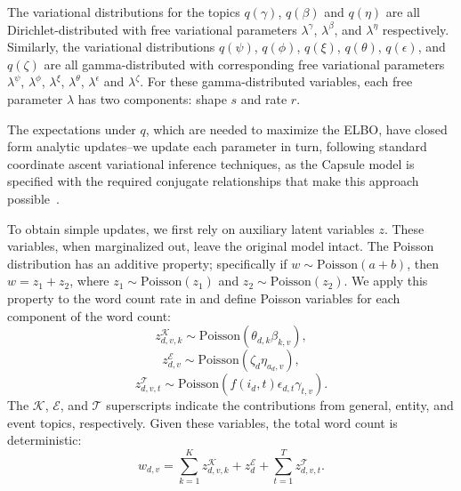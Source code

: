 The variational distributions for the topics $q(\gamma)$, $q(\beta)$ and $q(\eta)$ are all Dirichlet-distributed with free variational parameters $\lambda^\gamma$, $\lambda^\beta$, and $\lambda^\eta$ respectively.  Similarly, the variational distributions $q(\psi)$, $q(\phi)$, $q(\xi)$, $q(\theta)$, $q(\epsilon)$, and $q(\zeta)$ are all gamma-distributed with corresponding free variational parameters $\lambda^\psi$, $\lambda^\phi$, $\lambda^\xi$, $\lambda^\theta$, $\lambda^\epsilon$ and $\lambda^\zeta$.  For these gamma-distributed variables, each free parameter $\lambda$ has two components: shape $s$ and rate $r$.

The expectations under $q$, which are needed to maximize the ELBO, have closed form analytic updates--we update each parameter in turn, following standard coordinate ascent variational inference techniques, as the Capsule model is specified with the required conjugate relationships that make this approach possible~\cite{Ghahramani:2001}.


To obtain simple updates, we first rely on auxiliary latent variables $z$. These variables, when marginalized out, leave the original model intact. The Poisson distribution has an additive property; specifically if $w \sim \mbox{Poisson}(a+b)$, then $w = z_1 + z_2$, where $z_1 \sim \mbox{Poisson}(z_1)$ and $z_2 \sim \mbox{Poisson}(z_2)$.  We apply this property to the word count rate in  and define Poisson variables for each component of the word count:
\[ z^\mathcal{K}_{d,v,k} \sim \mbox{Poisson}(\theta_{d,k}\beta_{k,v}), \]
\[ z^\mathcal{E}_{d,v} \sim \mbox{Poisson}(\zeta_{d}\eta_{a_d,v}), \]
\[ z^\mathcal{T}_{d,v,t} \sim \mbox{Poisson}\left(f(i_d, t) \epsilon_{d,t} \gamma_{t,v}\right). \]
The $\mathcal{K}$, $\mathcal{E}$, and $\mathcal{T}$ superscripts indicate the contributions from general, entity, and event topics, respectively.  Given these variables, the total word count is deterministic:
\[ w_{d,v} = \sum_{k=1}^K z^\mathcal{K}_{d,v,k} + z^\mathcal{E}_{d} + \sum_{t=1}^T z^\mathcal{T}_{d,v,t}. \]

